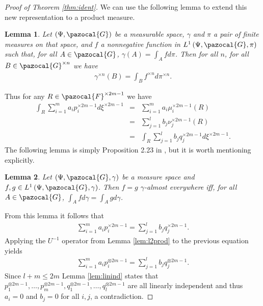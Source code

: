 \documentclass[aos]{imsart}
\def\sF{\pazocal{F}}
\def\sG{\pazocal{G}}
\theoremstyle{plain}
\newtheorem{lem}{Lemma}[section]
\theoremstyle{defintion}
\begin{document}
\begin{proof}[Proof of Theorem \ref{thm:ident}]
		We can use the following lemma to extend this new representation to a product measure.

		\begin{lem} \label{lem:radprod}
			Let $\left( \Psi, \sG \right)$ be a measurable space, $\gamma$ and $\pi$ a pair of finite measures on that space, and $f$ a nonnegative function in $L^1\left(\Psi,\sG, \pi \right)$ such that, for all $A \in \sG$, $\gamma\left( A \right)=\int_A f d\pi$. Then for all $n$, for all $B \in \sG^{\times n}$ we have
			\begin{eqnarray*}
				\gamma^{\times n}\left( B \right) = \int_B f^{\times n} d\pi^{\times n}.
			\end{eqnarray*}
		\end{lem}
		Thus for any $R \in \sF^{\times 2m-1}$  we have
		\begin{eqnarray*}
			\int_R \sum_{i=1}^{m} a_i p_i^{\times 2m-1} d\xi^{\times 2m-1} 
			&=&  \sum_{i=1}^{m} a_i \mu_i^{\times 2m-1}\left( R \right)\\
		 &=&  \sum_{j=1}^{l} b_j \nu_j^{\times 2m-1}\left( R \right)\\
		 &=& \int_R \sum_{j=1}^{l} b_j q_j^{\times 2m-1}d\xi^{\times 2m-1}.
		\end{eqnarray*}
		The following lemma is simply Proposition 2.23 in \cite{folland99}, but it is worth mentioning explicitly.
		\begin{lem} \label{lem:inteq}
			Let $\left( \Psi,\sG,\gamma \right)$ be a measure space and $f,g \in L^1\left( \Psi,\sG,\gamma \right)$. Then $f=g$ $\gamma$-almost everywhere iff, for all $A\in \sG$, $\int_A f d\gamma = \int_A g d\gamma$.
		\end{lem}
		From this lemma it follows that
		\begin{eqnarray*}
			\sum_{i=1}^{m} a_i p_i^{\times 2m-1} = \sum_{j=1}^{l} b_j q_j^{\times 2m-1}.
		\end{eqnarray*}
		Applying the $U^{-1}$ operator from Lemma \ref{lem:l2prod} to the previous equation yields
		\begin{eqnarray*}
			\sum_{i=1}^{m} a_i p_i^{\otimes 2m-1} = \sum_{j=1}^{l} b_j q_j^{\otimes 2m-1}.
		\end{eqnarray*}
		Since $l+m \le2m$ Lemma \ref{lem:linind} states that $p_1^{\otimes 2m-1},\ldots,p_{m}^{\otimes 2m-1},q_1^{\otimes 2m-1},\ldots,q_{l}^{\otimes 2m-1}$ are all linearly independent and thus $a_i = 0$ and $b_j = 0$ for all $i,j$, a contradiction.
	\end{proof}
\end{document}
